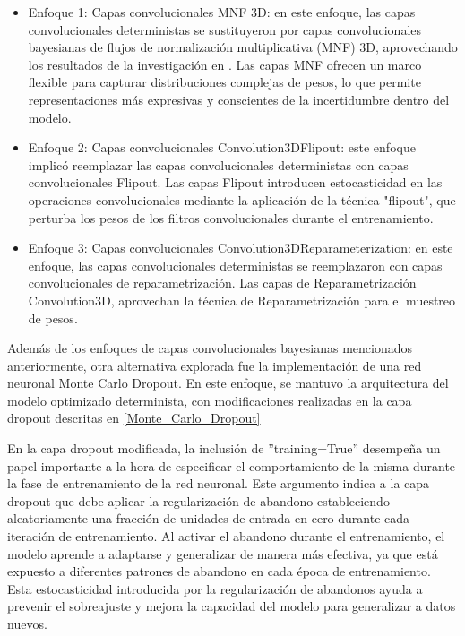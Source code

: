 \documentclass[10pt, oneside, a4paper]{article}
\begin{document}
	\begin{itemize}
		\item Enfoque 1: Capas convolucionales MNF 3D: en este enfoque, las capas convolucionales deterministas se sustituyeron por capas convolucionales bayesianas de flujos de normalización multiplicativa (MNF) 3D, aprovechando los resultados de la investigación en \cite{mnf}. Las capas MNF ofrecen un marco flexible para capturar distribuciones complejas de pesos, lo que permite representaciones más expresivas y conscientes de la incertidumbre dentro del modelo.
		
		\item Enfoque 2: Capas convolucionales Convolution3DFlipout: este enfoque implicó reemplazar las capas convolucionales deterministas con capas convolucionales Flipout. Las capas Flipout introducen estocasticidad en las operaciones convolucionales mediante la aplicación de la técnica "flipout", que perturba los pesos de los filtros convolucionales durante el entrenamiento.
		
		\item Enfoque 3: Capas convolucionales Convolution3DReparameterization: en este enfoque, las capas convolucionales deterministas se reemplazaron con capas convolucionales de reparametrización. Las capas de Reparametrización Convolution3D, aprovechan la técnica de Reparametrización para el muestreo de pesos. %
		
	\end{itemize}

	Además de los enfoques de capas convolucionales bayesianas mencionados anteriormente, otra alternativa explorada fue la implementación de una red neuronal Monte Carlo Dropout. En este enfoque, se mantuvo la arquitectura del modelo optimizado determinista, con modificaciones realizadas en la capa dropout descritas en \ref{Monte_Carlo_Dropout}

	En la capa dropout modificada, la inclusión de ''training=True'' desempeña un papel importante a la hora de especificar el comportamiento de la misma durante la fase de entrenamiento de la red neuronal. Este argumento indica a la capa dropout que debe aplicar la regularización de abandono estableciendo aleatoriamente una fracción de unidades de entrada en cero durante cada iteración de entrenamiento. Al activar el abandono durante el entrenamiento, el modelo aprende a adaptarse y generalizar de manera más efectiva, ya que está expuesto a diferentes patrones de abandono en cada época de entrenamiento. Esta estocasticidad introducida por la regularización de abandonos ayuda a prevenir el sobreajuste y mejora la capacidad del modelo para generalizar a datos nuevos.
		
\end{document}
